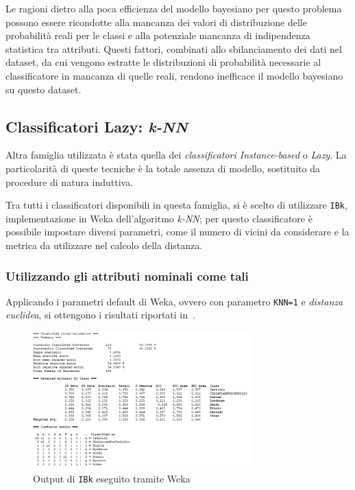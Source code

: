 \documentclass[a4paper,11pt,twoside,notitlepage,final]{scrartcl}
\begin{document}
Le ragioni dietro alla poca efficienza del modello bayesiano per questo problema possono essere ricondotte alla mancanza dei valori di distribuzione delle probabilità reali per le classi e alla potenziale mancanza di indipendenza statistica tra attributi.
Questi fattori, combinati allo sbilanciamento dei dati nel dataset, da cui vengono estratte le distribuzioni di probabilità necessarie al classificatore in mancanza di quelle reali, rendono inefficace il modello bayesiano su questo dataset.

\subsection{Classificatori Lazy: \emph{k-NN}}\label{subsec:ibk}

Altra famiglia utilizzata è stata quella dei \emph{classificatori Instance-based} o \emph{Lazy}.
La particolarità di queste tecniche è la totale assenza di modello, sostituito da procedure di natura induttiva.

Tra tutti i classificatori disponibili in questa famiglia, si è scelto di utilizzare \texttt{IBk}, implementazione in Weka dell'algoritmo \emph{k-NN};
per questo classificatore è possibile impostare diversi parametri, come il numero di vicini da considerare e la metrica da utilizzare nel calcolo della distanza.

\subsubsection{Utilizzando gli attributi nominali come tali}\label{subsub:ibk:nominal}

Applicando i parametri default di Weka, ovvero con parametro \texttt{KNN=1} e \emph{distanza euclidea}, si ottengono i risultati riportati in~.

\begin{figure}[H]
  \centering
  \includegraphics[width=0.75\textwidth]{fig/kNN1.PNG}%
  \caption{Output di \texttt{IBk} eseguito tramite Weka}%
  \label{fig:ibk:1}
\end{figure}
\end{document}
